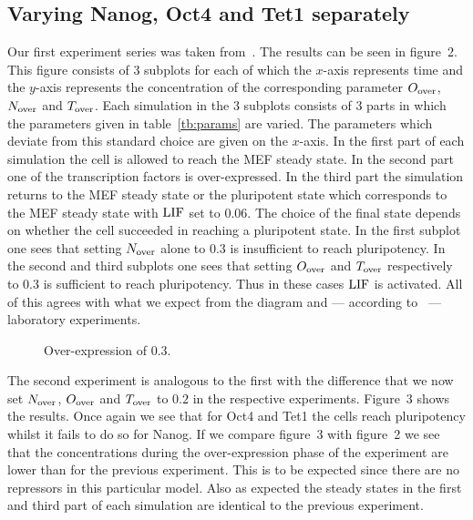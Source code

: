 \subsection{Varying Nanog, Oct4 and Tet1 separately}

Our first experiment series was taken from~\cite{Olariu2016}.
The results can be seen in figure~2. This figure consists of 3 subplots 
for each of which the $x$-axis represents time and the $y$-axis represents the concentration of the 
corresponding parameter $O_\text{over}$, $N_\text{over}$ and $T_\text{over}$. Each simulation in the 3 subplots consists of 
3 parts in which the parameters given in table~\ref{tb:params} are varied. The parameters which deviate from this standard choice are
given on the $x$-axis. In the first part of each simulation the cell is allowed to reach the MEF steady state. 
In the second part one of the transcription factors is over-expressed.
In the third part the simulation returns to the MEF steady state or the pluripotent state which corresponds to the MEF steady state with $\text{LIF}$ set to $0.06$.
The choice of the final state depends on whether the cell succeeded in reaching a pluripotent state.
In the first subplot one sees that setting $N_\text{over}$ alone to $0.3$ is insufficient to reach pluripotency.
In the second and third subplots one sees that setting $O_\text{over}$ and $T_\text{over}$ respectively to $0.3$ is sufficient
to reach pluripotency. Thus in these cases $\text{LIF}$ is activated.
All of this agrees with what we expect from the diagram and --- according to~\cite{Olariu2016} --- laboratory experiments.

\begin{figure}
\centering
\begin{minipage}[t]{0.3\textwidth}
\centering
\graphicspath{{../Plots/}}

\end{minipage}
\hfill
\begin{minipage}[t]{0.3\textwidth}
\centering
\graphicspath{{../Plots/}}

\end{minipage}
\hspace*{0.2cm}
\begin{minipage}[t]{0.3\textwidth}
\centering
\graphicspath{{../Plots/}}

\end{minipage}
\caption{Over-expression of $0.3$.}
\end{figure}

The second experiment is analogous to the first with the difference that we now set
$N_\text{over}$, $O_\text{over}$ and $T_\text{over}$ to $0.2$ in the respective experiments. Figure~3 
shows the results. Once again we see that
for Oct4 and Tet1 the cells reach pluripotency whilst it fails to do so for Nanog.
If we compare figure~3 with figure~2 we see that the concentrations
during the over-expression phase of the experiment are lower than for the previous experiment.
This is to be expected since there are no repressors in this particular model.
Also as expected the steady states in the first and third part of each simulation are identical to
the previous experiment.


